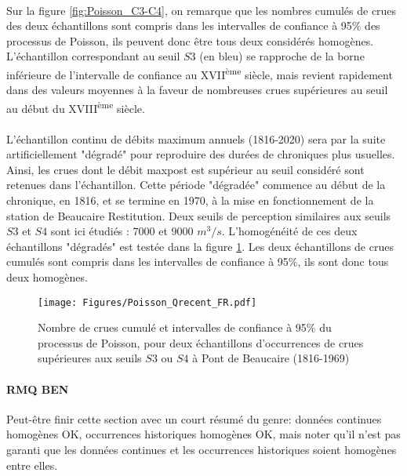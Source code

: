 \documentclass[11pt]{article}
\begin{document}
	\paragraph{} Sur la figure \ref{fig:Poisson_C3-C4}, on remarque que les nombres cumulés de crues des deux échantillons sont compris dans les intervalles de confiance à 95\% des processus de Poisson, ils peuvent donc être tous deux considérés homogènes. L'échantillon correspondant au seuil $S3$ (en bleu) se rapproche de la borne inférieure de l'intervalle de confiance au XVII\textsuperscript{ème} siècle, mais revient rapidement dans des valeurs moyennes à la faveur de nombreuses crues supérieures au seuil au début du XVIII\textsuperscript{ème} siècle. 
	
	\paragraph{} L'échantillon continu de débits maximum annuels (1816-2020) sera par la suite artificiellement "dégradé" pour reproduire des durées de chroniques plus usuelles. Ainsi, les crues dont le débit maxpost est supérieur au seuil considéré sont retenues dans l'échantillon. Cette période "dégradée" commence au début de la chronique, en 1816, et se termine en 1970, à la mise en fonctionnement de la station de Beaucaire Restitution. Deux seuils de perception similaires aux seuils $S3$ et $S4$ sont ici étudiés : 7000 et 9000 $m^3/s$. L'homogénéité de ces deux échantillons "dégradés" est testée dans la figure \ref{fig:Poisson_Recent}. Les deux échantillons de crues cumulés sont compris dans les intervalles de confiance à 95\%, ils sont donc tous deux homogènes. 
	
	\begin{figure}[h]
		\centering
		\texttt{[image: Figures/Poisson\_Qrecent\_FR.pdf]}	
		\caption{Nombre de crues cumulé et intervalles de confiance à 95\% du processus de 						Poisson, pour deux échantillons d'occurrences de crues supérieures aux seuils $S3$ ou $S4$ à Pont de Beaucaire 							(1816-1969) }
		\label{fig:Poisson_Recent}
	\end{figure}
	
	
	\paragraph{RMQ BEN} Peut-être finir cette section avec un court résumé du genre: données continues homogènes OK, occurrences historiques homogènes OK, mais noter qu'il n'est pas garanti que les données continues et les occurrences historiques soient homogènes entre elles.		
		
\end{document}
